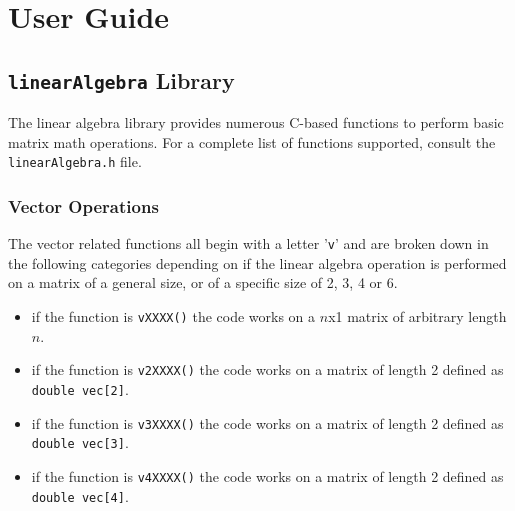 
\section{User Guide}

\subsection{{\tt linearAlgebra} Library}
The linear algebra library provides numerous C-based functions to perform basic matrix math operations.  For a complete list of functions supported, consult the {\tt linearAlgebra.h} file.

\subsubsection{Vector Operations}
The vector related functions all begin with a letter '{\tt v}' and are broken down in the following categories depending on if the linear algebra operation is performed on a matrix of a general size, or of a specific size of 2, 3, 4 or 6.
\begin{itemize}
	\item if the function is  {\tt vXXXX()} the code works on a $n$x1 matrix of arbitrary length $n$.
	\item if the function is {\tt v2XXXX()}  the code works on a matrix of length 2 defined as {\tt double vec[2]}.
	\item if the function is {\tt v3XXXX()}  the code works on a matrix of length 2 defined as {\tt double vec[3]}.
	\item if the function is {\tt v4XXXX()} the code works on a matrix of length 2 defined as {\tt double vec[4]}.
\end{itemize}

